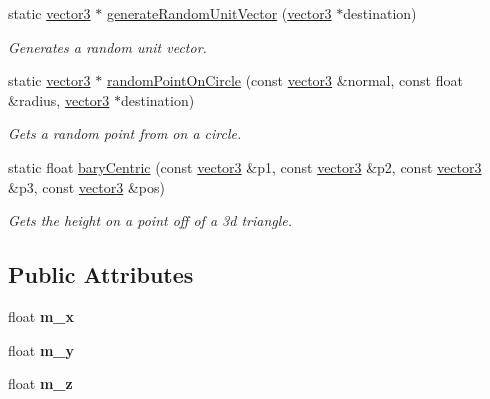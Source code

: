 \begin{DoxyCompactItemize}
static \hyperlink{classflounder_1_1vector3}{vector3} $\ast$ \hyperlink{classflounder_1_1vector3_a6c8eeac56a831b4e3ca221e19f86031e}{generate\+Random\+Unit\+Vector} (\hyperlink{classflounder_1_1vector3}{vector3} $\ast$destination)
\begin{DoxyCompactList}\small\item\em Generates a random unit vector. \end{DoxyCompactList}\item 
static \hyperlink{classflounder_1_1vector3}{vector3} $\ast$ \hyperlink{classflounder_1_1vector3_a70876957cd503a2c1d3189906042d1ae}{random\+Point\+On\+Circle} (const \hyperlink{classflounder_1_1vector3}{vector3} \&normal, const float \&radius, \hyperlink{classflounder_1_1vector3}{vector3} $\ast$destination)
\begin{DoxyCompactList}\small\item\em Gets a random point from on a circle. \end{DoxyCompactList}\item 
static float \hyperlink{classflounder_1_1vector3_a5b1cacfef8116eaf8a9b56db239e665d}{bary\+Centric} (const \hyperlink{classflounder_1_1vector3}{vector3} \&p1, const \hyperlink{classflounder_1_1vector3}{vector3} \&p2, const \hyperlink{classflounder_1_1vector3}{vector3} \&p3, const \hyperlink{classflounder_1_1vector3}{vector3} \&pos)
\begin{DoxyCompactList}\small\item\em Gets the height on a point off of a 3d triangle. \end{DoxyCompactList}\end{DoxyCompactItemize}
\subsection*{Public Attributes}
\begin{DoxyCompactItemize}
\item 
\mbox{\label{classflounder_1_1vector3_ad918e45150b8592f7df0adf6f42f659f}} 
float {\bfseries m\+\_\+x}
\item 
\mbox{\label{classflounder_1_1vector3_a97943cf2e405b425b2e5a0dc3e82a599}} 
float {\bfseries m\+\_\+y}
\item 
\mbox{\label{classflounder_1_1vector3_ac42f1fb1339ac221ba25a7bc07c3a148}} 
float {\bfseries m\+\_\+z}
\end{DoxyCompactItemize}


